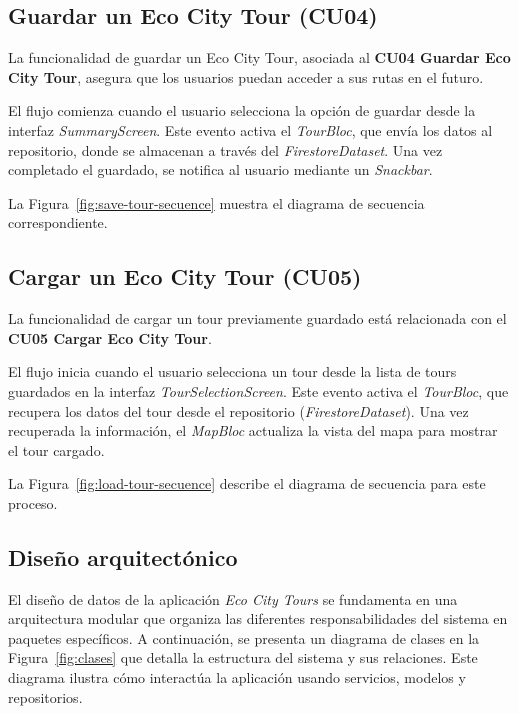 \subsection{Guardar un Eco City Tour (CU04)}
La funcionalidad de guardar un Eco City Tour, asociada al \textbf{CU04 Guardar Eco City Tour}, asegura que los usuarios puedan acceder a sus rutas en el futuro.

El flujo comienza cuando el usuario selecciona la opción de guardar desde la interfaz \textit{SummaryScreen}. Este evento activa el \textit{TourBloc}, que envía los datos al repositorio, donde se almacenan a través del \textit{FirestoreDataset}. Una vez completado el guardado, se notifica al usuario mediante un \textit{Snackbar}.

La Figura~\ref{fig:save-tour-secuence} muestra el diagrama de secuencia correspondiente.


\subsection{Cargar un Eco City Tour (CU05)}
La funcionalidad de cargar un tour previamente guardado está relacionada con el \textbf{CU05 Cargar Eco City Tour}.

El flujo inicia cuando el usuario selecciona un tour desde la lista de tours guardados en la interfaz \textit{TourSelectionScreen}. Este evento activa el \textit{TourBloc}, que recupera los datos del tour desde el repositorio (\textit{FirestoreDataset}). Una vez recuperada la información, el \textit{MapBloc} actualiza la vista del mapa para mostrar el tour cargado.

La Figura~\ref{fig:load-tour-secuence} describe el diagrama de secuencia para este proceso.




\subsection{Diseño arquitectónico}

El diseño de datos de la aplicación \textit{Eco City Tours} se fundamenta en una arquitectura modular que organiza las diferentes responsabilidades del sistema en paquetes específicos. A continuación, se presenta un diagrama de clases en la Figura~\ref{fig:clases} que detalla la estructura del sistema y sus relaciones. Este diagrama ilustra cómo interactúa la aplicación usando servicios, modelos y repositorios.

